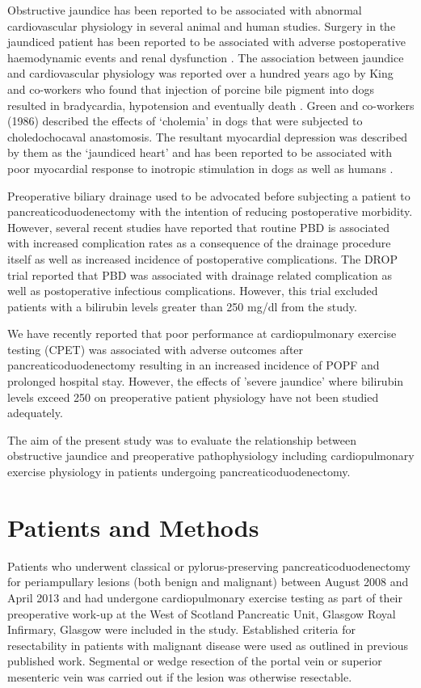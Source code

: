 Obstructive jaundice has been reported to be associated with abnormal cardiovascular physiology in several animal and human studies. 
Surgery in the jaundiced patient has been reported to be associated with adverse postoperative haemodynamic events and renal dysfunction \parencite{pain_perioperative_1985,green_systemic_1995}. 
The association between jaundice and cardiovascular physiology was reported over a hundred years ago by King and co-workers who found that injection of porcine bile pigment into dogs resulted in bradycardia, hypotension and eventually death \parencite{king_effect_1909}. 
Green and co-workers (1986) described the effects of ‘cholemia' in dogs that were subjected to choledochocaval anastomosis. 
The resultant myocardial depression was described by them as the ‘jaundiced heart'\parencite{green_jaundiced_1986} and has been reported to be associated with poor myocardial response to inotropic stimulation in dogs \parencite{binah_obstructive_1985, bomzon_systemic_1986} as well as humans \parencite{lumlertgul_jaundiced_1991}.

Preoperative biliary drainage used to be advocated before subjecting a patient to pancreaticoduodenectomy with the intention of reducing postoperative morbidity. 
However, several recent studies have reported that routine PBD is associated with increased complication rates as a consequence of the drainage procedure itself as well as increased incidence of postoperative complications. 
The DROP trial reported that PBD was associated with drainage related complication as well as postoperative infectious complications. 
However, this trial excluded patients with a bilirubin levels greater than 250 mg/dl from the study. 

We have recently reported that poor performance at cardiopulmonary exercise testing (CPET) was associated with adverse outcomes after pancreaticoduodenectomy resulting in an increased incidence of POPF and prolonged hospital stay. 
However, the effects of 'severe jaundice' where bilirubin levels exceed 250 on preoperative patient physiology have not been studied adequately. 

The aim of the present study was to evaluate the relationship between obstructive jaundice and preoperative pathophysiology including cardiopulmonary exercise physiology in patients undergoing pancreaticoduodenectomy.

\clearpage

\section{Patients and Methods}
Patients who underwent classical or pylorus-preserving pancreaticoduodenectomy for periampullary lesions (both benign and malignant) between August 2008 and April 2013 and had undergone cardiopulmonary exercise testing as part of their preoperative work-up at the West of Scotland Pancreatic Unit, Glasgow Royal Infirmary, Glasgow were included in the study. 
Established criteria for resectability in patients with malignant disease were used as outlined in previous published work. 
Segmental or wedge resection of the portal vein or superior mesenteric vein was carried out if the lesion was otherwise resectable.

